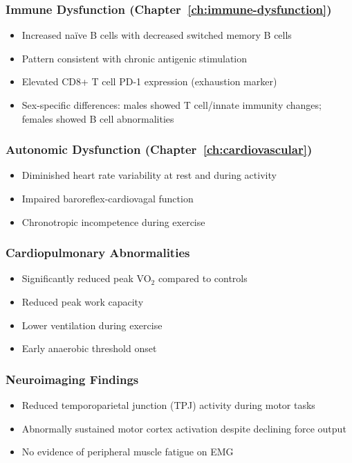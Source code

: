 \subsubsection{Immune Dysfunction (Chapter~\ref{ch:immune-dysfunction})}
\begin{itemize}
    \item Increased naïve B cells with decreased switched memory B cells
    \item Pattern consistent with chronic antigenic stimulation
    \item Elevated CD8+ T cell PD-1 expression (exhaustion marker)
    \item Sex-specific differences: males showed T cell/innate immunity changes; females showed B cell abnormalities
\end{itemize}

\subsubsection{Autonomic Dysfunction (Chapter~\ref{ch:cardiovascular})}
\begin{itemize}
    \item Diminished heart rate variability at rest and during activity
    \item Impaired baroreflex-cardiovagal function
    \item Chronotropic incompetence during exercise
\end{itemize}

\subsubsection{Cardiopulmonary Abnormalities}
\begin{itemize}
    \item Significantly reduced peak VO$_2$ compared to controls
    \item Reduced peak work capacity
    \item Lower ventilation during exercise
    \item Early anaerobic threshold onset
\end{itemize}

\subsubsection{Neuroimaging Findings}
\begin{itemize}
    \item Reduced temporoparietal junction (TPJ) activity during motor tasks
    \item Abnormally sustained motor cortex activation despite declining force output
    \item No evidence of peripheral muscle fatigue on EMG
\end{itemize}

